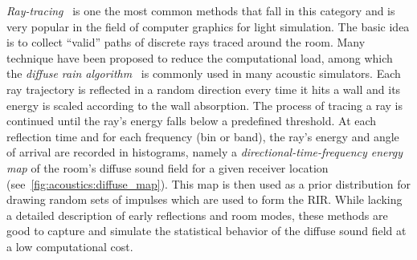 \mynewline
\textit{Ray-tracing}~ is one the most common methods that fall in this category and is very popular in the field of computer graphics for light simulation.
The basic idea is to collect ``valid'' paths of discrete rays traced around the room.
Many technique have been proposed to reduce the computational load, among which the \textit{diffuse rain algorithm}~ is commonly used in many acoustic simulators.
Each ray trajectory is reflected in a random direction every time it hits a wall and its energy is scaled according to the wall absorption.
The process of tracing a ray is continued until the ray’s energy falls below a predefined threshold.
At each reflection time and for each frequency (bin or band), the ray's energy and angle of arrival are recorded in histograms,
namely a \textit{directional-time-frequency energy map} of the room’s diffuse sound field for a given receiver location (see~\cref{fig:acoustics:diffuse_map}). This map is then used as a prior distribution for drawing random sets of impulses which are used to form the \ac{RIR}.
While lacking a detailed description of early reflections and room modes,
these methods are good to capture and simulate the statistical behavior of the diffuse sound field at a low computational cost.

